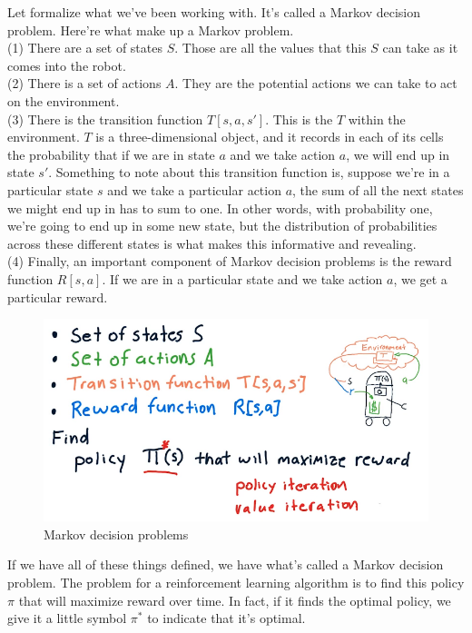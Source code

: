 \documentclass[12pt]{article}
\begin{document}
Let formalize what we've been working with. It's called a Markov decision problem. Here're what make up a Markov problem. \\
(1) There are a set of states $S$. Those are all the values that this $S$ can take as it comes into the robot. \\
(2) There is a set of actions $A$. They are the potential actions we can take to act on the environment. \\
(3) There is the transition function $T[s, a, s']$. This is the $T$ within the environment. $T$ is a three-dimensional object, and it records in each of its cells the probability that if we are in state $a$ and we take action $a$, we will end up in state $s'$. Something to note about this transition function is, suppose we're in a particular state $s$ and we take a particular action $a$, the sum of all the next states we might end up in has to sum to one. In other words, with probability one, we're going to end up in some new state, but the distribution of probabilities across these different states is what makes this informative and revealing. \\
(4) Finally, an important component of Markov decision problems is the reward function $R[s, a]$. If we are in a particular state and we take action $a$, we get a particular reward. 

\begin{figure}[!ht]
\centering
\includegraphics[scale=0.42]{fig/fig100}
\caption{Markov decision problems}
\end{figure}

If we have all of these things defined, we have what's called a Markov decision problem. The problem for a reinforcement learning algorithm is to find this policy $\pi$ that will maximize reward over time. In fact, if it finds the optimal policy, we give it a little symbol $\pi^\ast$ to indicate that it's optimal. 
\end{document}
